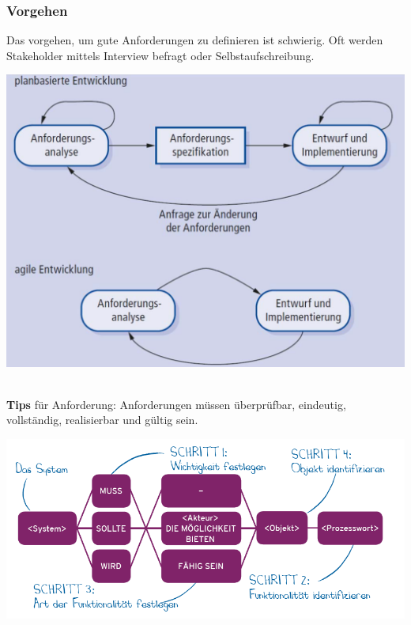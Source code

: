 \subsubsection{Vorgehen}
Das vorgehen, um gute Anforderungen zu definieren ist schwierig. Oft werden Stakeholder mittels Interview befragt oder Selbstaufschreibung.  
\begin{center}
	\includegraphics[width=0.8\columnwidth]{Images/requirements_engeneering}
\end{center}

~\\
\textbf{Tips} für Anforderung: Anforderungen müssen überprüfbar, eindeutig, vollständig, realisierbar und gültig sein.
\begin{center}
	\includegraphics[width=\columnwidth]{Images/schablone}
\end{center}

